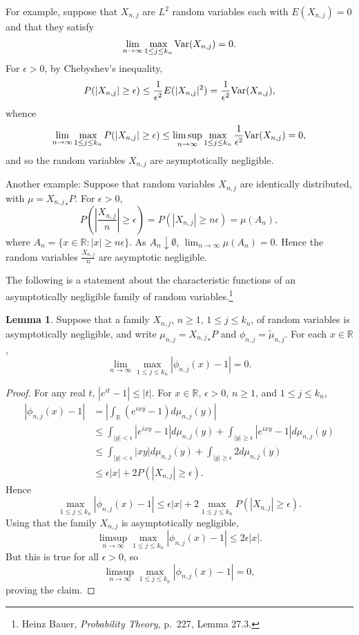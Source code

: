 \documentclass{article}
\newcommand{\Var}{\ensuremath\mathrm{Var}}
\theoremstyle{definition}
\newtheorem{lemma}[theorem]{Lemma}
\theoremstyle{definition}
\begin{document}
For example, suppose that $X_{n,j}$ are $L^2$ random variables each with $E(X_{n,j})=0$ and that they satisfy
\[
\lim_{n \to \infty} \max_{1 \leq j \leq k_n} \Var(X_{n,j}) = 0.
\]
For $\epsilon>0$, by Chebyshev's inequality,
\[
P(|X_{n,j}| \geq \epsilon) \leq \frac{1}{\epsilon^2} E(|X_{n,j}|^2)
=\frac{1}{\epsilon^2} \Var(X_{n,j}),
\]
whence
\[
\lim_{n \to \infty} \max_{1 \leq j \leq k_n} P(|X_{n,j}| \geq \epsilon)
\leq \limsup_{n \to \infty} \max_{1 \leq j \leq k_n} \frac{1}{\epsilon^2} \Var(X_{n,j})
=0,
\]
and so the random variables $X_{n,j}$ are asymptotically negligible.

Another example: Suppose that random variables $X_{n,j}$ are identically distributed,
with $\mu={X_{n,j}}_*P$.
For $\epsilon>0$,
\[
P\left(\left|\frac{X_{n,j}}{n} \right| \geq \epsilon \right)
=P(|X_{n,j}| \geq n\epsilon)
=\mu(A_n),
\]
where $A_n=\{x \in \mathbb{R}: |x| \geq n\epsilon\}$. As $A_n \downarrow \emptyset$,
$\lim_{n \to \infty} \mu(A_n) = 0$. Hence
the random variables $\frac{X_{n,j}}{n}$ are asymptotic negligible.

The following is a statement about the characteristic functions of an asymptotically negligible
family of random variables.\footnote{Heinz Bauer, {\em Probability Theory}, p.~227, Lemma 27.3.}

\begin{lemma}
Suppose that a family $X_{n,j}$, $n \geq 1$, $1 \leq j \leq k_n$, of random variables
is asymptotically negligible,
and write $\mu_{n,j}={X_{n,j}}_*P$ and $\phi_{n,j} = \tilde{\mu}_{n,j}$.
For each $x \in \mathbb{R}$,
\[
\lim_{n \to \infty} \max_{1 \leq j \leq k_n} |\phi_{n,j}(x)-1| = 0.
\]
\end{lemma}
\begin{proof}
For any real $t$, $|e^{it}-1| \leq |t|$. For $x \in \mathbb{R}$, $\epsilon>0$, $n \geq 1$,  and $1 \leq j \leq k_n$,
\begin{align*}
|\phi_{n,j}(x)-1|&=\left|\int_\mathbb{R} (e^{ixy}-1) d\mu_{n,j}(y) \right|\\
&\leq \int_{|y|<\epsilon} |e^{ixy}-1| d\mu_{n,j}(y)
+\int_{|y| \geq \epsilon} |e^{ixy}-1| d\mu_{n,j}(y)\\
&\leq \int_{|y|<\epsilon} |xy| d\mu_{n,j}(y)+\int_{|y| \geq \epsilon} 2 d\mu_{n,j}(y)\\
&\leq \epsilon |x| + 2 P(|X_{n,j}| \geq \epsilon).
\end{align*}
Hence
\[
\max_{1 \leq j \leq k_n} |\phi_{n,j}(x)-1| \leq \epsilon |x| + 2\max_{1 \leq j \leq k_n} P(|X_{n,j}| \geq \epsilon).
\]
Using that the family $X_{n,j}$ is asymptotically negligible,
\[
\limsup_{n \to \infty} \max_{1 \leq j \leq k_n} |\phi_{n,j}(x)-1| \leq 2\epsilon |x|.
\]
But this is true for all $\epsilon>0$, so
\[
\limsup_{n \to \infty} \max_{1 \leq j \leq k_n} |\phi_{n,j}(x)-1|  = 0,
\]
proving the claim.
\end{proof}
\end{document}
